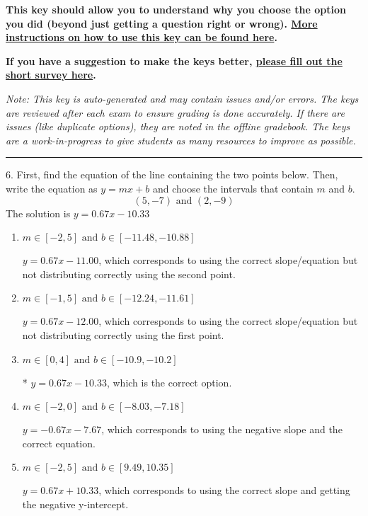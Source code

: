 \documentclass{extbook}[14pt]
\begin{document}
\textbf{This key should allow you to understand why you choose the option you did (beyond just getting a question right or wrong). \href{https://xronos.clas.ufl.edu/mac1105spring2020/courseDescriptionAndMisc/Exams/LearningFromResults}{More instructions on how to use this key can be found here}.}

\textbf{If you have a suggestion to make the keys better, \href{https://forms.gle/CZkbZmPbC9XALEE88}{please fill out the short survey here}.}

\textit{Note: This key is auto-generated and may contain issues and/or errors. The keys are reviewed after each exam to ensure grading is done accurately. If there are issues (like duplicate options), they are noted in the offline gradebook. The keys are a work-in-progress to give students as many resources to improve as possible.}

\rule{\textwidth}{0.4pt}

6. First, find the equation of the line containing the two points below. Then, write the equation as $ y=mx+b $ and choose the intervals that contain $m$ and $b$.
\[ (5, -7) \text{ and } (2, -9) \] 
The solution is $ y = 0.67x - 10.33 $ 

\begin{enumerate}[label=\Alph*.] 
\item $ m \in [-2, 5] \text{ and } b \in [-11.48, -10.88] $ 

  $y = 0.67x - 11.00$, which corresponds to using the correct slope/equation but not distributing correctly using the second point. 
\item $ m \in [-1, 5] \text{ and } b \in [-12.24, -11.61] $ 

  $y = 0.67x - 12.00$, which corresponds to using the correct slope/equation but not distributing correctly using the first point. 
\item $ m \in [0, 4] \text{ and } b \in [-10.9, -10.2] $ 

 * $y = 0.67x - 10.33$, which is the correct option. 
\item $ m \in [-2, 0] \text{ and } b \in [-8.03, -7.18] $ 

  $y = -0.67x - 7.67$, which corresponds to using the negative slope and the correct equation. 
\item $ m \in [-2, 5] \text{ and } b \in [9.49, 10.35] $ 

  $y = 0.67x + 10.33$, which corresponds to using the correct slope and getting the negative y-intercept. 
\end{enumerate} 
 
\end{document}

